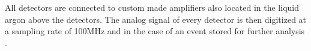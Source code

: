 \documentclass[encoding=utf8,british]{tumphthesis}
\begin{document}
All detectors are connected to custom made amplifiers also located in the liquid argon above the detectors.
The analog signal of every detector is then digitized at a sampling rate of 100MHz and in the case of an event stored for further analysis \cite{riboldi_cryogenic_2015}.
\\

\end{document}

